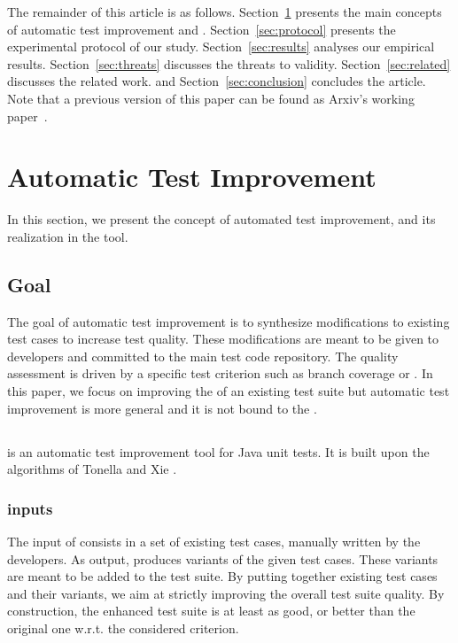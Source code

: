 The remainder of this article is as follows.
Section~\ref{sec:dspot} presents the main concepts of automatic test improvement and \dspot.
Section~\ref{sec:protocol} presents the experimental protocol of our study.
Section~\ref{sec:results} analyses our empirical results. 
Section~\ref{sec:threats} discusses the threats to validity.
Section~\ref{sec:related} discusses the related work.
and Section~\ref{sec:conclusion} concludes the article.
Note that a previous version of this paper can be found as Arxiv's working paper~\cite{BaudryARM15}.

\section{Automatic Test Improvement}
\label{sec:dspot}

In this section, we present the concept of automated test improvement, and its realization in the \dspot tool.

\subsection{Goal}

The goal of automatic test improvement is to synthesize modifications to existing test cases to increase test quality.
These modifications are meant to be given to developers and committed to the main test code repository.
The quality assessment is driven by a specific test criterion such as branch coverage or \ms.
In this paper, we focus on improving the \ms of an existing test suite but automatic test improvement is more general and it is not bound to the \ms.

\subsection{\dspot}

\dspot is an  automatic test improvement tool for Java unit tests. It is built upon the algorithms of Tonella \cite{tonella} and Xie \cite{TaoXie2006}.

\subsubsection{\dspot inputs}

The input of \dspot consists in a set of existing test cases, manually written by the developers.
As output, \dspot produces variants of the given test cases. These variants are meant to be added to the test suite. By putting together existing test cases and their variants, we aim at strictly improving the overall test suite quality. By construction, the enhanced test suite is at least as good, or better than the original one w.r.t. the considered criterion.

